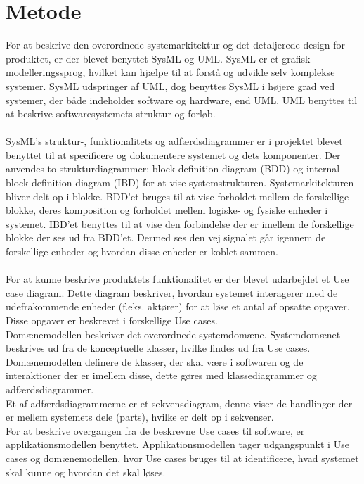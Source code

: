 \section{Metode}
\cite{SysML} For at beskrive den overordnede systemarkitektur og det detaljerede design for produktet, er der blevet benyttet SysML og UML. SysML er et grafisk modelleringssprog, hvilket kan hjælpe til at forstå og udvikle selv komplekse systemer. SysML udspringer af UML, dog benyttes SysML i højere grad ved systemer, der både indeholder software og hardware, end UML. UML benyttes til at beskrive softwaresystemets struktur og forløb. \cite{uml}
\\
\\
SysML’s struktur-, funktionalitets og adfærdsdiagrammer er i projektet blevet benyttet til at specificere og dokumentere systemet og dets komponenter. Der anvendes to strukturdiagrammer; block definition diagram (BDD) og internal block definition diagram (IBD) for at vise systemstrukturen. Systemarkitekturen bliver delt op i blokke. BDD'et bruges til at vise forholdet mellem de forskellige blokke, deres komposition og forholdet mellem logiske- og fysiske enheder i systemet. IBD'et benyttes til at vise den forbindelse der er imellem de forskellige blokke der ses ud fra BDD'et. Dermed ses den vej signalet går igennem de forskellige enheder og hvordan disse enheder er koblet sammen.\\
\\ 
For at kunne beskrive produktets funktionalitet er der blevet udarbejdet et Use case diagram. Dette diagram beskriver, hvordan systemet interagerer med de udefrakommende enheder (f.eks. aktører) for at løse et antal af opsatte opgaver. Disse opgaver er beskrevet i forskellige Use cases. \\
Domænemodellen beskriver det overordnede systemdomæne. Systemdomænet beskrives ud fra de konceptuelle klasser, hvilke findes ud fra Use cases. Domænemodellen definere de klasser, der skal være i softwaren og de interaktioner der er imellem disse, dette gøres med klassediagrammer og adfærdsdiagrammer.\\
Et af adfærdsdiagrammerne er et sekvensdiagram, denne viser de handlinger der er mellem systemets dele (parts), hvilke er delt op i sekvenser.\\
For at beskrive overgangen fra de beskrevne Use cases til software, er applikationsmodellen benyttet. Applikationsmodellen tager udgangspunkt i Use cases og domænemodellen, hvor Use cases bruges til at identificere, hvad systemet skal kunne og hvordan det skal løses. \\

